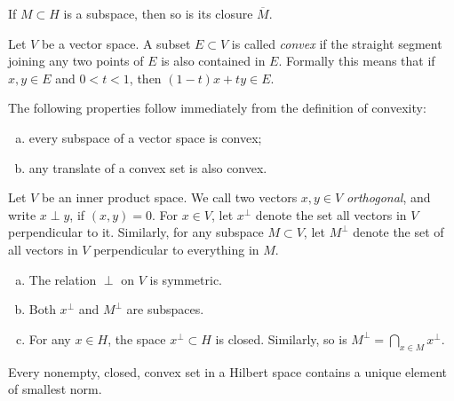 \begin{remark}
  If $M \subset H$ is a subspace, then so is its closure $\overline{M}$.
\end{remark}

\begin{definition}
  Let $V$ be a vector space. A subset $E \subset V$ is called \emph{convex} if the straight segment joining any two points of $E$ is also contained in $E$. Formally this means that if $x,y \in E$ and $0 < t < 1$, then $(1-t) x + t y \in E$.
\end{definition}

\begin{remark}
  The following properties follow immediately from the definition of convexity:
  \begin{enumerate}[(a)]
  \item every subspace of a vector space is convex;
  \item any translate of a convex set is also convex.
  \end{enumerate}
\end{remark}

\begin{definition}
  Let $V$ be an inner product space. We call two vectors $x,y \in V$ \emph{orthogonal}, and write $x \perp y$, if $(x,y) = 0$. For $x \in V$, let $x^\perp$ denote the set all vectors in $V$ perpendicular to it. Similarly, for any subspace $M \subset V$, let $M^\perp$ denote the set of all vectors in $V$ perpendicular to everything in $M$.
\end{definition}

\begin{remark}
  \mbox{}
  \begin{enumerate}[(a)]
  \item The relation $\perp$ on $V$ is symmetric.
  \item Both $x^\perp$ and $M^\perp$ are subspaces.
  \item For any $x \in H$, the space $x^\perp \subset H$ is closed. Similarly, so is $M^\perp = \bigcap_{x \in M} x^\perp$.
  \end{enumerate}
\end{remark}

\begin{theorem}
  Every nonempty, closed, convex set in a Hilbert space contains a unique element of smallest norm.
\end{theorem}

